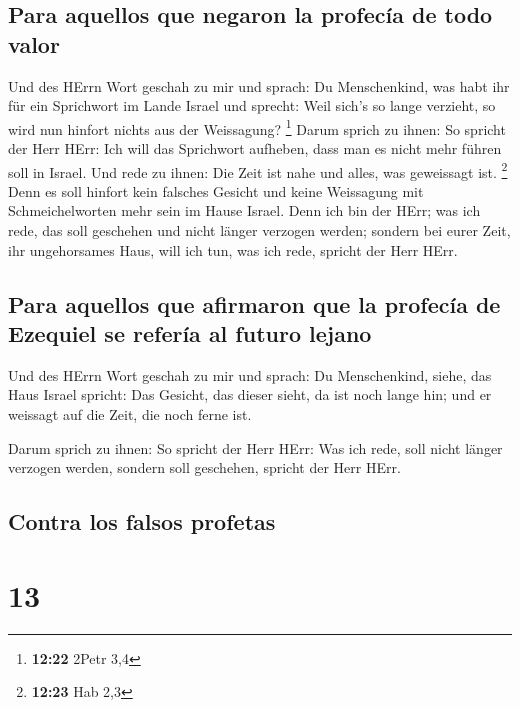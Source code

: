\hypertarget{para-aquellos-que-negaron-la-profecuxeda-de-todo-valor}{%
\subsection{Para aquellos que negaron la profecía de todo
valor}\label{para-aquellos-que-negaron-la-profecuxeda-de-todo-valor}}

 Und des HErrn Wort geschah zu mir und sprach:
 Du Menschenkind, was habt ihr für ein Sprichwort im
Lande Israel und sprecht: Weil sich's so lange verzieht, so wird nun
hinfort nichts aus der Weissagung? \footnote{\textbf{12:22} 2Petr 3,4}
 Darum sprich zu ihnen: So spricht der Herr HErr: Ich
will das Sprichwort aufheben, dass man es nicht mehr führen soll in
Israel. Und rede zu ihnen: Die Zeit ist nahe und alles, was geweissagt
ist. \footnote{\textbf{12:23} Hab 2,3}  Denn es soll
hinfort kein falsches Gesicht und keine Weissagung mit Schmeichelworten
mehr sein im Hause Israel.  Denn ich bin der HErr; was
ich rede, das soll geschehen und nicht länger verzogen werden; sondern
bei eurer Zeit, ihr ungehorsames Haus, will ich tun, was ich rede,
spricht der Herr HErr.

\hypertarget{para-aquellos-que-afirmaron-que-la-profecuxeda-de-ezequiel-se-referuxeda-al-futuro-lejano}{%
\subsection{Para aquellos que afirmaron que la profecía de Ezequiel se
refería al futuro
lejano}\label{para-aquellos-que-afirmaron-que-la-profecuxeda-de-ezequiel-se-referuxeda-al-futuro-lejano}}

 Und des HErrn Wort geschah zu mir und sprach:
 Du Menschenkind, siehe, das Haus Israel spricht: Das
Gesicht, das dieser sieht, da ist noch lange hin; und er weissagt auf
die Zeit, die noch ferne ist.

 Darum sprich zu ihnen: So spricht der Herr HErr: Was ich
rede, soll nicht länger verzogen werden, sondern soll geschehen, spricht
der Herr HErr.

\hypertarget{contra-los-falsos-profetas}{%
\subsection{Contra los falsos
profetas}\label{contra-los-falsos-profetas}}

\hypertarget{section-12}{%
\section{13}\label{section-12}}

